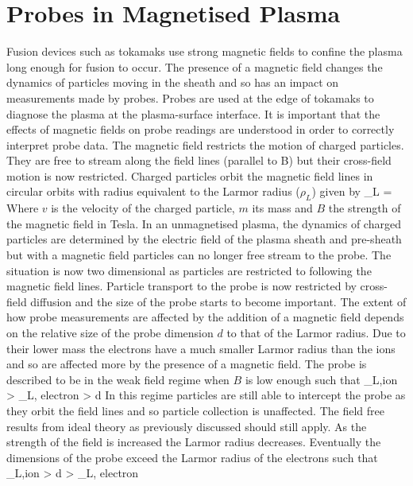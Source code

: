 \section{Probes in Magnetised Plasma} \label{Section:magnetised}
Fusion devices such as tokamaks use strong magnetic fields to confine the plasma long enough for fusion to occur. The presence of a magnetic field changes the dynamics of particles moving in the sheath and so has an impact on measurements made by probes. Probes are used at the edge of tokamaks to diagnose the plasma at the plasma-surface interface. It is important that the effects of magnetic fields on probe readings are understood in order to correctly interpret probe data.
The magnetic field restricts the motion of charged particles. They are free to stream along the field lines (parallel to B) but their cross-field motion is now restricted. Charged particles orbit the magnetic field lines in circular orbits with radius equivalent to the Larmor radius ($\rho_L$) given by
\be 
\rho_L = 
\ee
Where $v$ is the velocity of the charged particle, $m$ its mass and $B$ the strength of the magnetic field in Tesla.  In an unmagnetised plasma, the dynamics of charged particles are determined by the electric field of the plasma sheath and pre-sheath but with a magnetic field particles can no longer free stream to the probe.
The situation is now two dimensional as particles are restricted to following the magnetic field lines. Particle transport to the probe is now restricted by cross-field diffusion and the size of the probe starts to become important. 
The extent of how probe measurements are affected by the addition of a magnetic field depends on the relative size of the probe dimension $d$ to that of the Larmor radius. Due to their lower mass the electrons have a much smaller Larmor radius than the ions and so are affected more by the presence of a magnetic field. The probe is described to be in the weak field regime when $B$ is low enough such that
\be
\rho_{L,ion} > \rho_{L, electron} > d
\ee
In this regime particles are still able to intercept the probe as they orbit the field lines and so particle collection is unaffected. The field free results from ideal theory as previously discussed should still apply. As the strength of the field is increased the Larmor radius decreases. Eventually the dimensions of the probe exceed the Larmor radius of the electrons such that 
\be
\rho_{L,ion} > d >  \rho_{L, electron}
\ee
